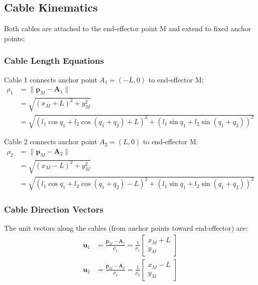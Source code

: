 \documentclass[11pt,a4paper]{article}
\begin{document}
\subsection{Cable Kinematics}
Both cables are attached to the end-effector point M and extend to fixed anchor points:

\subsubsection{Cable Length Equations}
Cable 1 connects anchor point $A_1 = (-L, 0)$ to end-effector M:
\begin{align}
\rho_1 &= \|\bm{p}_M - \bm{A}_1\| \\
&= \sqrt{(x_M + L)^2 + y_M^2} \\
&= \sqrt{(l_1 \cos q_1 + l_2 \cos(q_1 + q_2) + L)^2 + (l_1 \sin q_1 + l_2 \sin(q_1 + q_2))^2}
\end{align}

Cable 2 connects anchor point $A_2 = (L, 0)$ to end-effector M:
\begin{align}
\rho_2 &= \|\bm{p}_M - \bm{A}_2\| \\
&= \sqrt{(x_M - L)^2 + y_M^2} \\
&= \sqrt{(l_1 \cos q_1 + l_2 \cos(q_1 + q_2) - L)^2 + (l_1 \sin q_1 + l_2 \sin(q_1 + q_2))^2}
\end{align}

\subsubsection{Cable Direction Vectors}
The unit vectors along the cables (from anchor points toward end-effector) are:
\begin{align}
\bm{u}_1 &= \frac{\bm{p}_M - \bm{A}_1}{\rho_1} = \frac{1}{\rho_1}\begin{bmatrix} x_M + L \\ y_M \end{bmatrix} \\
\bm{u}_2 &= \frac{\bm{p}_M - \bm{A}_2}{\rho_2} = \frac{1}{\rho_2}\begin{bmatrix} x_M - L \\ y_M \end{bmatrix}
\end{align}
\end{document}
